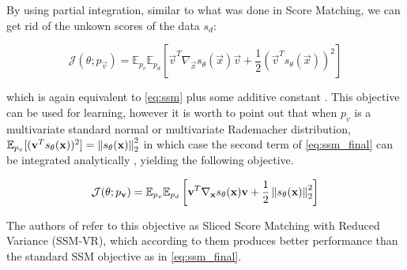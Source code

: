 By using partial integration, similar to what was done in Score Matching, we can get rid of the unkown scores of the data $s_d$:

\begin{equation}
    \label{eq:ssm_final}
    \mathcal{J}(\theta; p_\vec{v}) = \mathbb{E}_{p_v} \mathbb{E}_{p_d} \left[ \vec{v}^T \nabla_\vec{x} s_\theta(\vec{x}) \vec{v} + \frac{1}{2} \left( \vec{v}^T s_\theta(\vec{x}) \right)^2 \right]
\end{equation}

which is again equivalent to \ref{eq:ssm} plus some additive constant \cite{ssm}. This objective can be used for learning, however
it is worth to point out that when $p_v$ is a multivariate standard normal or multivariate Rademacher distribution, 
$\mathbb{E}_{p_v} [ ( \textbf{v}^T s_\theta(\textbf{x}) )^2 ] = \left\lVert s_\theta(\textbf{x})\right\rVert_2^2$ in which case the second term 
of \ref{eq:ssm_final} can be integrated analytically \cite{ssm}, yielding the following objective.

\begin{equation}
    \label{eq:ssm_vr}
    \mathcal{J}(\theta; p_{\textbf{v}}) = \mathbb{E}_{p_v} \mathbb{E}_{p_d} \left[ \textbf{v}^T \nabla_{\textbf{x}} s_\theta(\textbf{x}) \textbf{v} + \frac{1}{2} \left\lVert s_\theta(\textbf{x}) \right\rVert^2_2 \right]
\end{equation}

The authors of \cite{ssm} refer to this objective as 
Sliced Score Matching with Reduced Variance (SSM-VR), which according to them produces better performance than the standard SSM objective as 
in \ref{eq:ssm_final}.





